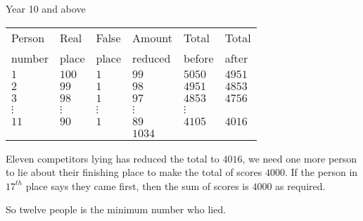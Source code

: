 \begin{MyInnerBox}{Year 10 and above}
{\begin{MySolutionBox}
\begin{tabular}{l|l|l|l|l|l}
          Person & Real & False & Amount & Total & Total\\
          number & place & place & reduced & before & after\\\hline
          \(1\) & \(100\) & \(1\) & \(99\) & \(5050\) & \(4951\)\\
          \(2\) & \(99\) & \(1\) & \(98\) & \(4951\) & \(4853\)\\
          \(3\) & \(98\) & \(1\) & \(97\) & \(4853\) & \(4756\)\\
          \(\vdots\) & \(\vdots\) & \(\vdots\) & \(\vdots\) & \(\vdots\)\\
          \(11\) & \(90\) & \(1\) & \(89\) & \(4105\) & \(4016\)\\ \hline
           & & & \(1034\) & & \\
        \end{tabular}\par\medskip
        Eleven competitors lying has reduced the total to \(4016\), we need one more person to lie about their finishing place to make the total of scores \(4000\). If the person in \(17^{th}\) place says they came first, then the sum of scores is \(4000\) as required.\par
        So twelve people is the minimum number who lied.\par
      \end{MySolutionBox}
    }{}%
    \end{MyInnerBox}

